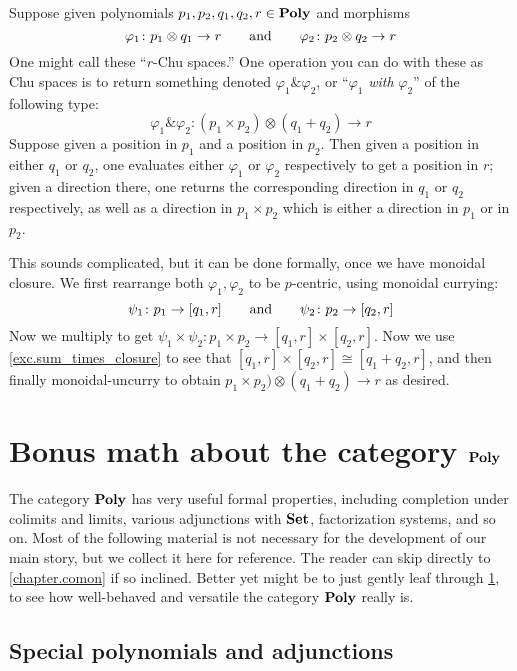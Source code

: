 \documentclass[Book-Poly]{subfiles}
\begin{document}
\begin{example}[Chu $\&$]
Suppose given polynomials $p_1,p_2,q_1,q_2,r\in\textbf{Poly}$ and morphisms
\[
	\varphi_1\colon p_1\otimes q_1\to r
	\qquad\text{and}\qquad
	\varphi_2\colon p_2\otimes q_2\to r
\]
One might call these ``$r$-Chu spaces.'' One operation you can do with these as Chu spaces is to return something denoted $\varphi_1\&\varphi_2$, or ``$\varphi_1$ \emph{with} $\varphi_2$'' of the following type:
\[
\varphi_1\&\varphi_2\colon (p_1\times p_2)\otimes (q_1+q_2)\to r
\]
Suppose given a position in $p_1$ and a position in $p_2$. Then given a position in either $q_1$ or $q_2$, one evaluates either $\varphi_1$ or $\varphi_2$ respectively to get a position in $r$; given a direction there, one returns the corresponding direction in $q_1$ or $q_2$ respectively, as well as a direction in $p_1\times p_2$ which is either a direction in $p_1$ or in $p_2$.

This sounds complicated, but it can be done formally, once we have monoidal closure. We first rearrange both $\varphi_1,\varphi_2$ to be $p$-centric, using monoidal currying:
\[
\psi_1\colon p_1\to [q_1,r]
\qquad\text{and}\qquad
\psi_2\colon p_2\to [q_2,r]
\]
Now we multiply to get $\psi_1\times\psi_2\colon p_1\times p_2\to[q_1,r]\times[q_2,r]$. Now we use \cref{exc.sum_times_closure} to see that $[q_1,r]\times[q_2,r]\cong[q_1+q_2,r]$, and then finally monoidal-uncurry to obtain $p_1\times p_2)\otimes(q_1+q_2)\to r$ as desired.
\end{example}


\section{Bonus math about the category $\textbf{Poly}$}\label{sec.bonus_poly}

The category $\textbf{Poly}$ has very useful formal properties, including completion under colimits and limits, various adjunctions with $\textbf{Set}$, factorization systems, and so on. Most of the following material is not necessary for the development of our main story, but we collect it here for reference. The reader can skip directly to \cref{chapter.comon} if so inclined. Better yet might be to just gently leaf through \cref{sec.bonus_poly}, to see how well-behaved and versatile the category $\textbf{Poly}$ really is.

\subsection{Special polynomials and adjunctions}
\end{document}
